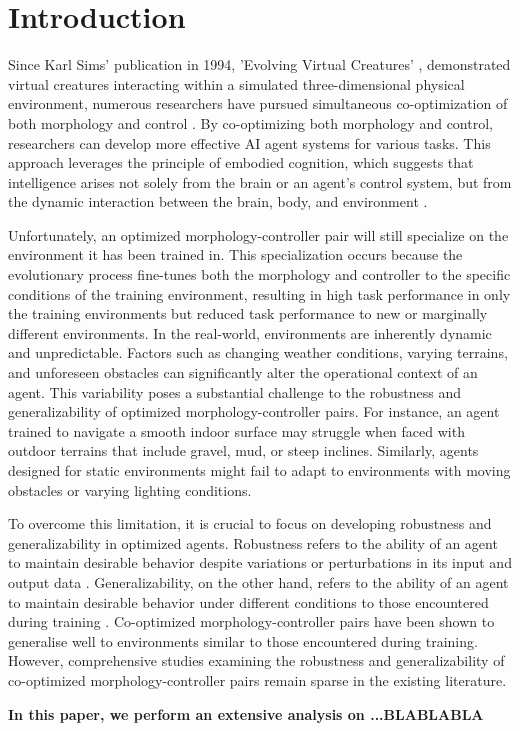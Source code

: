 \section{Introduction}
Since Karl Sims' publication in 1994, 'Evolving Virtual Creatures' \cite{Karl_Sims_1994}, demonstrated virtual creatures interacting within a simulated three-dimensional physical environment, numerous researchers have pursued simultaneous co-optimization of both morphology and control \cite{Cheney_2017,Emma_Stensby_2021,Joshua_Auerbach_2014,Luis_2024}. By co-optimizing both morphology and control, researchers can develop more effective AI agent systems for various tasks. This approach leverages the principle of embodied cognition, which suggests that intelligence arises not solely from the brain or an agent's control system, but from the dynamic interaction between the brain, body, and environment \cite{Josh_Bongard_2013}.

Unfortunately, an optimized morphology-controller pair will still specialize on the environment it has been trained in. This specialization occurs because the evolutionary process fine-tunes both the morphology and controller to the specific conditions of the training environment, resulting in high task performance in only the training environments but reduced task performance to new or marginally different environments. In the real-world, environments are inherently dynamic and unpredictable. Factors such as changing weather conditions, varying terrains, and unforeseen obstacles can significantly alter the operational context of an agent. This variability poses a substantial challenge to the robustness and generalizability of optimized morphology-controller pairs. For instance, an agent trained to navigate a smooth indoor surface may struggle when faced with outdoor terrains that include gravel, mud, or steep inclines. Similarly, agents designed for static environments might fail to adapt to environments with moving obstacles or varying lighting conditions.

To overcome this limitation, it is crucial to focus on developing robustness and generalizability in optimized agents. Robustness refers to the ability of an agent to maintain desirable behavior despite variations or perturbations in its input and output data \cite{Ravi_Mangal_2019, Charles_Packer_2019, Xu_Mengdi_2022}. Generalizability, on the other hand, refers to the ability of an agent to maintain desirable behavior under different conditions to those encountered during training \cite{Charles_Packer_2019,Xu_Mengdi_2022}. Co-optimized morphology-controller pairs have been shown to generalise well to environments similar to those encountered during training. However, comprehensive studies examining the robustness and generalizability of co-optimized morphology-controller pairs remain sparse in the existing literature.

\textbf{In this paper, we perform an extensive analysis on ...BLABLABLA}

